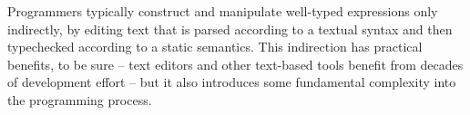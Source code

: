 





Programmers typically construct and manipulate well-typed expressions only indirectly, by editing text that is parsed according to a textual syntax and then typechecked according to a static semantics. This indirection has practical benefits, to be sure -- text editors and other text-based tools benefit from decades of development effort -- but it also introduces some fundamental complexity into the programming process. 


